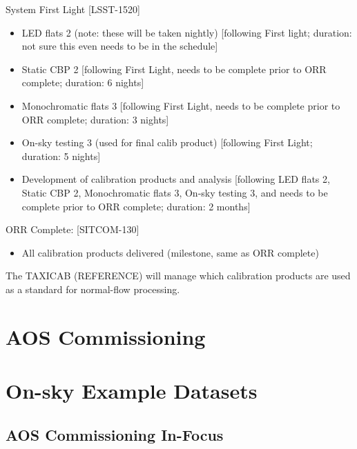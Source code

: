 \documentclass[SE,authoryear,toc,lsstdraft]{lsstdoc}
\begin{document}
System First Light [LSST-1520]

\begin{itemize}

  \item LED flats 2 (note: these will be taken nightly) [following First light; duration: not sure this even needs to be in the
schedule]

  \item Static CBP 2 [following First Light, needs to be complete prior to ORR complete; duration: 6 nights]

  \item Monochromatic flats 3 [following First Light, needs to be complete prior to ORR complete; duration: 3 nights]

  \item On-sky testing 3 (used for final calib product) [following First Light; duration: 5 nights]

  \item Development of calibration products and analysis [following LED flats 2, Static CBP 2, Monochromatic
flats 3, On-sky testing 3, and needs to be complete prior to ORR complete; duration: 2 months]

\end{itemize}

ORR Complete: [SITCOM-130]

\begin{itemize}

  \item All calibration products delivered (milestone, same as ORR complete)

\end{itemize}

The TAXICAB (REFERENCE) will manage which calibration products are used as a standard for normal-flow processing.

\section{AOS Commissioning}

\section{On-sky Example Datasets}

\subsection{AOS Commissioning In-Focus}
\end{document}
